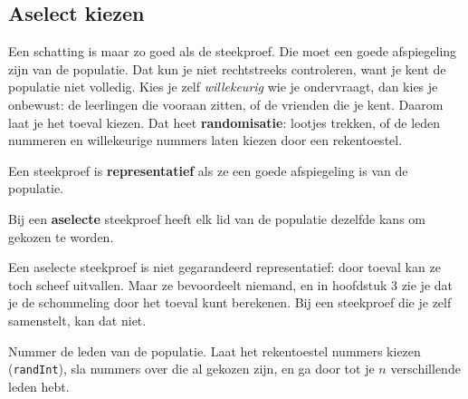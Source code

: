 \begin{oefeningen}
\end{oefeningen}

\subsection{Aselect kiezen}

Een schatting is maar zo goed als de steekproef. Die moet een goede afspiegeling zijn van de populatie. Dat kun je niet rechtstreeks controleren, want je kent de populatie niet volledig. Kies je zelf \textit{willekeurig} wie je ondervraagt, dan kies je onbewust: de leerlingen die vooraan zitten, of de vrienden die je kent. Daarom laat je het toeval kiezen. Dat heet \textbf{randomisatie}: lootjes trekken, of de leden nummeren en willekeurige nummers laten kiezen door een rekentoestel.

\begin{theorie}
Een steekproef is \textbf{\textcolor{accent}{representatief}} als ze een goede afspiegeling is van de populatie.

\vspace{1mm}
Bij een \textbf{\textcolor{accent}{aselecte}} steekproef heeft elk lid van de populatie dezelfde kans om gekozen te worden.
\end{theorie}

Een aselecte steekproef is niet gegarandeerd representatief: door toeval kan ze toch scheef uitvallen. Maar ze bevoordeelt niemand, en in hoofdstuk 3 zie je dat je de schommeling door het toeval kunt berekenen. Bij een steekproef die je zelf samenstelt, kan dat niet.


\begin{werkwijze}
Nummer de leden van de populatie. Laat het rekentoestel nummers kiezen (\texttt{randInt}), sla nummers over die al gekozen zijn, en ga door tot je $n$ verschillende leden hebt.
\end{werkwijze}

